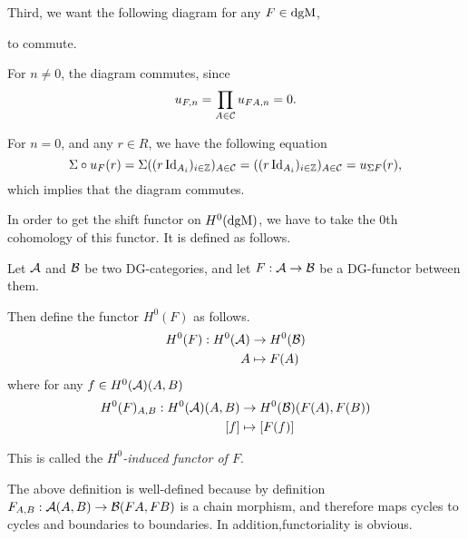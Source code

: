 \begin{remark}
    Third, we want the following diagram for any \( F \in \operatorname{dgM} \),
    \begin{center}
    \end{center}
    to commute.

    For \( n \neq 0 \), the diagram commutes, since 
    \[
        u_{F, n} = \prod_{A \in {\mathcal{C}}} u_{F A, n} = 0.
    \]

    For \( n = 0 \), and any \( r \in R \), we have the following equation
    \[
        \Sigma \circ u_F (r) = \Sigma ((r \operatorname{Id}_{A_i})_{i \in {\mathbb{Z}}})_{A \in {\mathcal{C}}} = ((r \operatorname{Id}_{A_i})_{i \in {\mathbb{Z}}})_{A \in {\mathcal{C}}} = u_{\Sigma F} (r),
    \]
    which implies that the diagram commutes.
\end{remark}

In order to get the shift functor on \( H^0(\operatorname{dgM}) \), we have to take the \( 0 \)th cohomology of this functor. It is defined as follows.

\begin{definition}
    \label{def:H^0-induced_functor}
    Let \( {\mathcal{A}} \) and \( {\mathcal{B}} \) be two DG-categories, and let \( F: {\mathcal{A}} \to {\mathcal{B}} \) be a DG-functor between them.

    Then define the functor \( H^0(F) \) as follows.
    \begin{align*}
        H^0(F): H^0({\mathcal{A}}) &\to H^0({\mathcal{B}}) \\
        A &\mapsto F(A)
    \end{align*}
    where for any \( f \in H^0({\mathcal{A}})(A, B) \)
    \begin{align*}
        H^0(F)_{A, B}: H^0({\mathcal{A}})(A, B) &\to H^0({\mathcal{B}})(F(A), F(B)) \\
        [f] &\mapsto [F(f)]
    \end{align*}

    This is called the \emph{\( H^0 \)-induced functor of \( F \)}.
\end{definition}

The above definition is well-defined because by definition \( F_{A, B}: {\mathcal{A}}(A, B) \to {\mathcal{B}}(F A, F B) \) is a chain morphism, and therefore maps cycles to cycles and boundaries to boundaries. In addition,functoriality is obvious.

